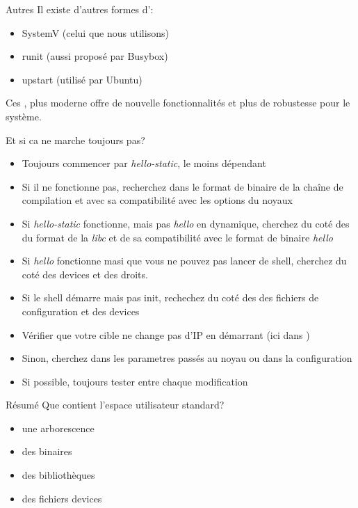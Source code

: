 \begin{frame}[fragile=singleslide]{Autres }
  Il existe d'autres formes d':
  \begin{itemize}
  \item SystemV (celui que nous utilisons)
  \item runit (aussi proposé par Busybox)
  \item upstart (utilisé par Ubuntu)
  \end{itemize}
  Ces ,  plus moderne  offre de nouvelle  fonctionnalités et
  plus de robustesse pour le système.
\end{frame}

\begin{frame}{Et si ca ne marche toujours pas?}
  \begin{itemize}
  \item Toujours commencer par  \emph{hello-static}, le moins dépendant
  \item Si il ne fonctionne  pas, recherchez dans le format de binaire
    de  la chaîne  de compilation  et avec  sa compatibilité  avec les
    options du noyaux
  \item  Si \emph{hello-static} fonctionne,  mais pas  \emph{hello} en
    dynamique, cherchez du coté des  du format de la \emph{libc} et de
    sa compatibilité avec le format de binaire \emph{hello}
  \item Si \emph{hello} fonctionne masi  que vous ne pouvez pas lancer
    de shell, cherchez du coté des devices et des droits.
  \item Si le  shell démarre mais pas init, rechechez  du coté des des
    fichiers de configuration et des devices
  \item Vérifier que votre cible  ne change pas d'IP en démarrant (ici
    dans )
  \item Sinon, cherchez dans les parametres passés au noyau ou dans la
    configuration
  \item Si possible, toujours tester entre chaque modification
  \end{itemize}
\end{frame}

\begin{frame}{Résumé}
  Que contient l'espace utilisateur standard?
  \begin{itemize}
  \item une arborescence
  \item des binaires
  \item des bibliothèques
  \item des fichiers devices
  \end{itemize}
\end{frame}

